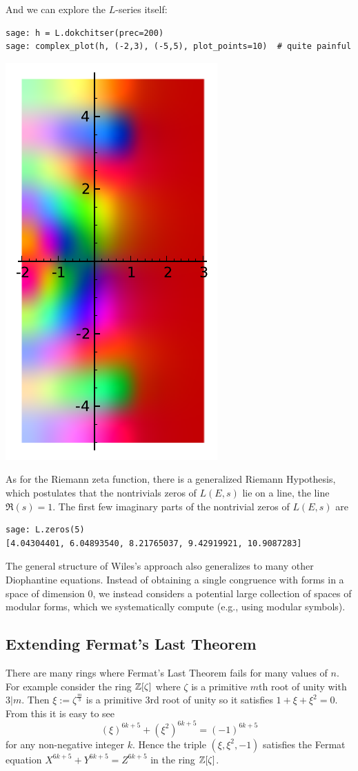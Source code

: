 \documentclass{book}
\begin{document}
And we can explore the $L$-series itself:

\begin{lstlisting}
sage: h = L.dokchitser(prec=200)
sage: complex_plot(h, (-2,3), (-5,5), plot_points=10)  # quite painful
\end{lstlisting}

\begin{center}
\includegraphics[width=.4\textwidth]{pics/27a-lser1.pdf}
\end{center}

As for the Riemann zeta function, there is a generalized Riemann
Hypothesis, which postulates that the nontrivials zeros of
$L(E,s)$ lie on a line, the line $\Re(s)=1$.
The first few imaginary parts of the nontrivial zeros of $L(E,s)$ are
\begin{lstlisting}
sage: L.zeros(5)
[4.04304401, 6.04893540, 8.21765037, 9.42919921, 10.9087283]
\end{lstlisting}

The general structure of Wiles's approach also generalizes to many other
Diophantine equations.  Instead of obtaining a single congruence with
forms in a space of dimension 0, we instead considers a potential
large collection of spaces of modular forms, which we systematically
compute (e.g., using modular symbols).

\subsection{Extending Fermat's Last Theorem} %

There are many rings where Fermat's Last Theorem fails for many values of
$n$. For example consider the ring $\mathbb{Z}[\zeta]$ where $\zeta$ is a primitive
$m$th root of unity with $3 | m$. Then $\xi := \zeta^\frac{m}{3}$ is
a primitive $3$rd root of unity so it satisfies $1+\xi+\xi^2=0$.
From this it is easy to see
$$
(\xi)^{6k+5} + (\xi^2)^{6k+5} = (-1)^{6k+5}
$$
for any non-negative integer $k$. Hence the triple $(\xi,\xi^2,-1)$ satisfies
the Fermat equation $X^{6k+5}+Y^{6k+5}=Z^{6k+5}$ in the ring $\mathbb{Z}[\zeta]$. \\
\end{document}
